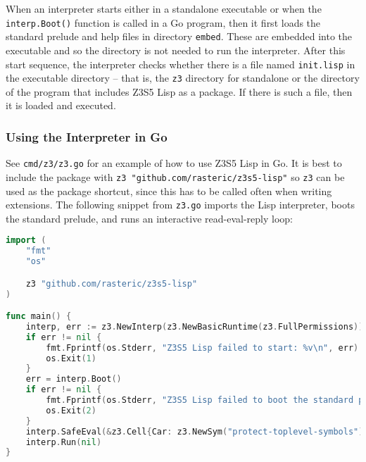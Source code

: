 \documentclass[
]{article}
\newcommand{\passthrough}[1]{#1}
\begin{document}
When an interpreter starts either in a standalone executable or when the
\passthrough{\lstinline!interp.Boot()!} function is called in a Go
program, then it first loads the standard prelude and help files in
directory \passthrough{\lstinline!embed!}. These are embedded into the
executable and so the directory is not needed to run the interpreter.
After this start sequence, the interpreter checks whether there is a
file named \passthrough{\lstinline!init.lisp!} in the executable
directory -- that is, the \passthrough{\lstinline!z3!} directory for
standalone or the directory of the program that includes Z3S5 Lisp as a
package. If there is such a file, then it is loaded and executed.

\hypertarget{using-the-interpreter-in-go}{%
\subsubsection{Using the Interpreter in
Go}\label{using-the-interpreter-in-go}}

See \passthrough{\lstinline!cmd/z3/z3.go!} for an example of how to use
Z3S5 Lisp in Go. It is best to include the package with
\passthrough{\lstinline!z3 "github.com/rasteric/z3s5-lisp"!} so
\passthrough{\lstinline!z3!} can be used as the package shortcut, since
this has to be called often when writing extensions. The following
snippet from \passthrough{\lstinline!z3.go!} imports the Lisp
interpreter, boots the standard prelude, and runs an interactive
read-eval-reply loop:

\begin{lstlisting}[language=Go]
import (
    "fmt"
    "os"

    z3 "github.com/rasteric/z3s5-lisp"
)

func main() {
    interp, err := z3.NewInterp(z3.NewBasicRuntime(z3.FullPermissions))
    if err != nil {
        fmt.Fprintf(os.Stderr, "Z3S5 Lisp failed to start: %v\n", err)
        os.Exit(1)
    }
    err = interp.Boot()
    if err != nil {
        fmt.Fprintf(os.Stderr, "Z3S5 Lisp failed to boot the standard prelude: %v\n", err)
        os.Exit(2)
    }
    interp.SafeEval(&z3.Cell{Car: z3.NewSym("protect-toplevel-symbols"), Cdr: z3.Nil}, z3.Nil)
    interp.Run(nil)
}
\end{lstlisting}
\end{document}
